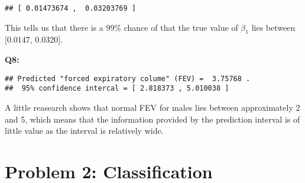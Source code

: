 \documentclass[]{article}
\newenvironment{Shaded}{\begin{snugshade}}{\end{snugshade}}
\newcommand{\KeywordTok}[1]{\textcolor[rgb]{0.13,0.29,0.53}{\textbf{#1}}}
\newcommand{\DataTypeTok}[1]{\textcolor[rgb]{0.13,0.29,0.53}{#1}}
\newcommand{\DecValTok}[1]{\textcolor[rgb]{0.00,0.00,0.81}{#1}}
\newcommand{\FloatTok}[1]{\textcolor[rgb]{0.00,0.00,0.81}{#1}}
\newcommand{\CharTok}[1]{\textcolor[rgb]{0.31,0.60,0.02}{#1}}
\newcommand{\StringTok}[1]{\textcolor[rgb]{0.31,0.60,0.02}{#1}}
\newcommand{\NormalTok}[1]{#1}
\begin{document}
\begin{verbatim}
## [ 0.01473674 ,  0.03203769 ]
\end{verbatim}

This tells us that there is a 99\% chance of that the true value of
\(\beta_1\) lies between {[}0.0147, 0.0320{]}.

\textbf{Q8:}

\begin{Shaded}
\end{Shaded}

\begin{verbatim}
## Predicted "forced expiratory colume" (FEV) =  3.75768 . 
##  95% confidence intercal = [ 2.818373 , 5.010038 ]
\end{verbatim}

A little reasearch shows that normal FEV for males lies between
approximately 2 and 5, which means that the information provided by the
prediction interval is of little value as the interval is relatively
wide.

\section{Problem 2: Classification}\label{problem-2-classification}
\end{document}
